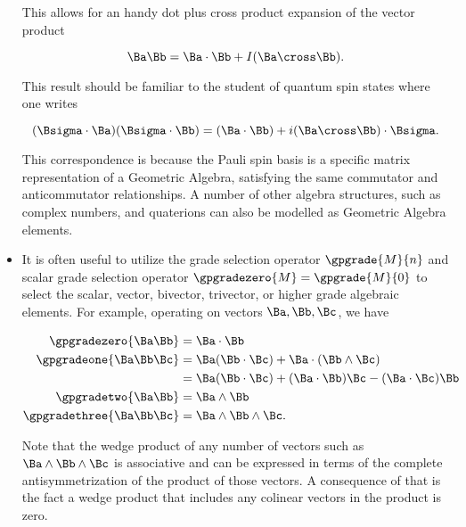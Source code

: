 \begin{itemize}
This allows for an handy dot plus cross product expansion of the vector product

\begin{dmath}\label{eqn:emtProblemSet1Appendix:180}
\Ba \Bb = \Ba \cdot \Bb + I (\Ba \cross \Bb).
\end{dmath}

This result should be familiar to the student of quantum spin states where one writes

\begin{dmath}\label{eqn:emtProblemSet1Appendix:200}
(\Bsigma \cdot \Ba) (\Bsigma \cdot \Bb) = (\Ba \cdot \Bb) + i (\Ba \cross \Bb) \cdot \Bsigma.
\end{dmath}

This correspondence is because the Pauli spin basis is a specific matrix representation of a Geometric Algebra, satisfying the same commutator and anticommutator relationships.  A number of other algebra structures, such as complex numbers, and quaterions can also be modelled as Geometric Algebra elements.
\item It is often useful to utilize the grade selection operator
\( \gpgrade{M}{n} \) and scalar grade selection operator \( \gpgradezero{M} = \gpgrade{M}{0} \)
to select the scalar, vector, bivector, trivector, or higher grade algebraic elements.  For example, operating on vectors \( \Ba, \Bb, \Bc \), we have

\begin{dmath}\label{eqn:emtProblemSet1Appendix:580}
\begin{aligned}
\gpgradezero{ \Ba \Bb }
&= \Ba \cdot \Bb \\
\gpgradeone{ \Ba \Bb \Bc }
&= 
\Ba (\Bb \cdot \Bc)
+ 
\Ba \cdot (\Bb \wedge \Bc) \\
&=
\Ba (\Bb \cdot \Bc)
+ 
(\Ba \cdot \Bb) \Bc
- 
(\Ba \cdot \Bc) \Bb \\
\gpgradetwo{\Ba \Bb} &=
\Ba \wedge \Bb \\
\gpgradethree{\Ba \Bb \Bc} &=
\Ba \wedge \Bb \wedge \Bc.
\end{aligned}
\end{dmath}

Note that the wedge product of any number of vectors such as \( \Ba \wedge \Bb \wedge \Bc \) is associative and can be expressed in terms of the complete antisymmetrization of the product of those vectors.  A consequence of that is the fact a wedge product that includes any colinear vectors in the product is zero.
\end{itemize}


